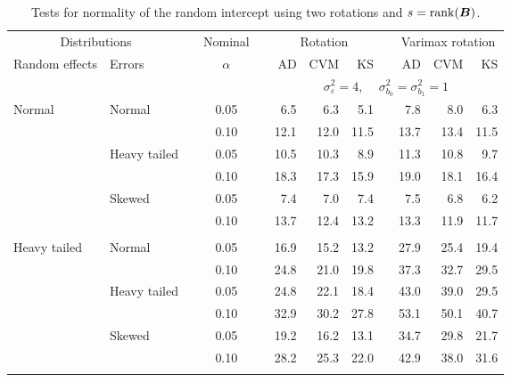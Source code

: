 \begin{table}[ht]
\caption{\label{tab:simb0sB-alt}Tests for normality of the random intercept using two rotations and $s = \operatorname{rank}(\bm{B})$.}
\begin{scriptsize}
\begin{center}
\begin{tabular}{ll p{.1cm} c p{.1cm} rrr p{.1cm} rrr}
  \hline
  \multicolumn{2}{c}{Distributions}& & Nominal & &  \multicolumn{3}{c}{Rotation} & & \multicolumn{3}{c}{Varimax rotation} \\ \cline{1-2} \cline{6-8} \cline{10-12}   
  Random effects & Errors & & $\alpha$ & & AD & CVM & KS & & AD & CVM & KS \\ 
   \hline
& && && \multicolumn{7}{c}{$\sigma_{\varepsilon}^2 = 4$, \ \ $\sigma_{b_0}^2 = \sigma_{b_1}^2 = 1$} \\ \cline{6-12}
\rowcolor{gray!20}Normal       & Normal       && 0.05 &&   6.5 & 6.3 & 5.1 &   & 7.8 & 8.0 & 6.3 \\ 
\rowcolor{gray!20}             &              && 0.10 &&   12.1 & 12.0 & 11.5 &   & 13.7 & 13.4 & 11.5 \\ 
\rowcolor{gray!20}             & Heavy tailed && 0.05 &&   10.5 & 10.3 & 8.9 &   & 11.3 & 10.8 & 9.7 \\ 
\rowcolor{gray!20}             &              && 0.10 &&   18.3 & 17.3 & 15.9 &   & 19.0 & 18.1 & 16.4 \\ 
\rowcolor{gray!20}             & Skewed       && 0.05 &&   7.4 & 7.0 & 7.4 &   & 7.5 & 6.8 & 6.2 \\ 
\rowcolor{gray!20}             &              && 0.10 &&   13.7 & 12.4 & 13.2 &   & 13.3 & 11.9 & 11.7 \\ 
&&&&&&&&&&&\\             
Heavy tailed & Normal       && 0.05 &&   16.9 & 15.2 & 13.2 &   & 27.9 & 25.4 & 19.4 \\ 
             &              && 0.10 &&   24.8 & 21.0 & 19.8 &   & 37.3 & 32.7 & 29.5 \\ 
             & Heavy tailed && 0.05 &&   24.8 & 22.1 & 18.4 &   & 43.0 & 39.0 & 29.5 \\ 
             &              && 0.10 &&   32.9 & 30.2 & 27.8 &   & 53.1 & 50.1 & 40.7 \\ 
             & Skewed       && 0.05 &&   19.2 & 16.2 & 13.1 &   & 34.7 & 29.8 & 21.7 \\ 
             &              && 0.10 &&   28.2 & 25.3 & 22.0 &   & 42.9 & 38.0 & 31.6 \\ 
&&&&&&&&&&&\\             

\end{tabular}
\end{center}
\end{scriptsize}
\end{table}
